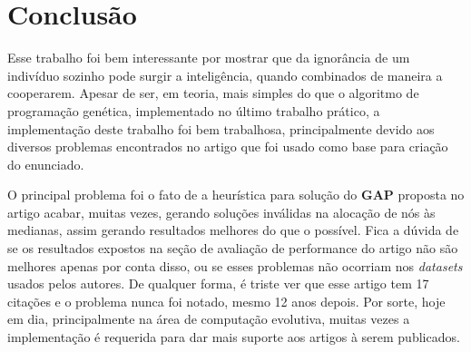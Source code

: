\section{Conclusão}

Esse trabalho foi bem interessante por mostrar que da ignorância de um indivíduo sozinho pode surgir a inteligência, quando combinados de maneira a cooperarem. Apesar de ser, em teoria, mais simples do que o algoritmo de programação genética, implementado no último trabalho prático, a implementação deste trabalho foi bem trabalhosa, principalmente devido aos diversos problemas encontrados no artigo que foi usado como base para criação do enunciado.

O principal problema foi o fato de a heurística para solução do \textbf{GAP} proposta no artigo acabar, muitas vezes, gerando soluções inválidas na alocação de nós às medianas, assim gerando resultados melhores do que o possível. Fica a dúvida de se os resultados expostos na seção de avaliação de performance do artigo não são melhores apenas por conta disso, ou se esses problemas não ocorriam nos \textit{datasets} usados pelos autores. De qualquer forma, é triste ver que esse artigo tem 17 citações e o problema nunca foi notado, mesmo 12 anos depois. Por sorte, hoje em dia, principalmente na área de computação evolutiva, muitas vezes a implementação é requerida para dar mais suporte aos artigos à serem publicados.